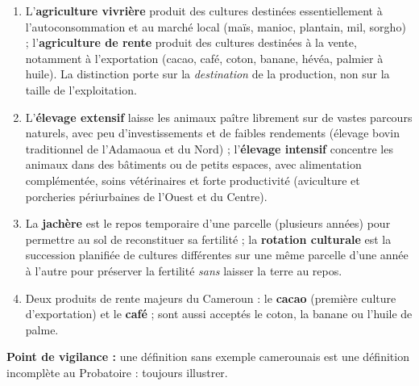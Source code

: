 \documentclass[11pt]{article}
\begin{document}
\begin{corrige}
\begin{enumerate}
\item L'\textbf{agriculture vivrière} produit des cultures destinées essentiellement à l'autoconsommation et au marché local (maïs, manioc, plantain, mil, sorgho) ; l'\textbf{agriculture de rente} produit des cultures destinées à la vente, notamment à l'exportation (cacao, café, coton, banane, hévéa, palmier à huile). La distinction porte sur la \emph{destination} de la production, non sur la taille de l'exploitation.
\item L'\textbf{élevage extensif} laisse les animaux paître librement sur de vastes parcours naturels, avec peu d'investissements et de faibles rendements (élevage bovin traditionnel de l'Adamaoua et du Nord) ; l'\textbf{élevage intensif} concentre les animaux dans des bâtiments ou de petits espaces, avec alimentation complémentée, soins vétérinaires et forte productivité (aviculture et porcheries périurbaines de l'Ouest et du Centre).
\item La \textbf{jachère} est le repos temporaire d'une parcelle (plusieurs années) pour permettre au sol de reconstituer sa fertilité ; la \textbf{rotation culturale} est la succession planifiée de cultures différentes sur une même parcelle d'une année à l'autre pour préserver la fertilité \emph{sans} laisser la terre au repos.
\item Deux produits de rente majeurs du Cameroun : le \textbf{cacao} (première culture d'exportation) et le \textbf{café} ; sont aussi acceptés le coton, la banane ou l'huile de palme.
\end{enumerate}
\textbf{Point de vigilance :} une définition sans exemple camerounais est une définition incomplète au Probatoire : toujours illustrer.
\end{corrige}
\end{document}
